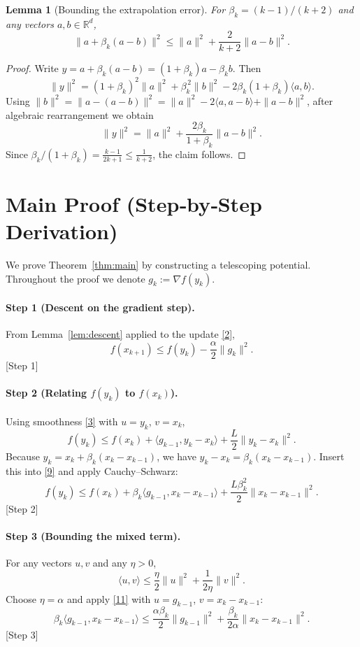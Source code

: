 \documentclass{article}
\newtheorem{lemma}{Lemma}
\newcommand{\R}{\mathbb{R}}
\begin{document}
\begin{lemma}[Bounding the extrapolation error]\label{lem:beta}
For $\beta_k=(k-1)/(k+2)$ and any vectors $a,b\in\R^d$,
\[
\|a+\beta_k(a-b)\|^2\le \|a\|^2+\frac{2}{k+2}\|a-b\|^2 .
\tag{7}
\]
\end{lemma}
\begin{proof}
Write $y=a+\beta_k(a-b) = (1+\beta_k)a-\beta_k b$.
Then
\[
\|y\|^2 = (1+\beta_k)^2\|a\|^2+\beta_k^{\,2}\|b\|^2-2\beta_k(1+\beta_k)\langle a,b\rangle .
\]
Using $\|b\|^2 = \|a-(a-b)\|^2 = \|a\|^2-2\langle a,a-b\rangle+\|a-b\|^2$, after algebraic rearrangement we obtain
\[
\|y\|^2 = \|a\|^2 + \frac{2\beta_k}{1+\beta_k}\|a-b\|^2 .
\]
Since $\beta_k/(1+\beta_k)=\frac{k-1}{2k+1}\le \frac{1}{k+2}$, the claim follows.
\end{proof}

\section*{Main Proof (Step‑by‑Step Derivation)}
We prove Theorem~\ref{thm:main} by constructing a telescoping potential.
Throughout the proof we denote $g_k:=\nabla f(y_k)$.

\paragraph{Step 1 (Descent on the gradient step).}
From Lemma~\ref{lem:descent} applied to the update \eqref{2},
\begin{equation}
f(x_{k+1}) \le f(y_k)-\frac{\alpha}{2}\|g_k\|^2 .
\tag{8}
\end{equation}
\hfill[Step 1]

\paragraph{Step 2 (Relating $f(y_k)$ to $f(x_k)$).}
Using smoothness \eqref{3} with $u=y_k$, $v=x_k$,
\[
f(y_k)\le f(x_k)+\langle g_{k-1},y_k-x_k\rangle+\frac{L}{2}\|y_k-x_k\|^2 .
\tag{9}
\]
Because $y_k = x_k+\beta_k(x_k-x_{k-1})$, we have $y_k-x_k=\beta_k (x_k-x_{k-1})$.
Insert this into \eqref{9} and apply Cauchy–Schwarz:
\[
f(y_k)\le f(x_k)+\beta_k\langle g_{k-1},x_k-x_{k-1}\rangle
      +\frac{L\beta_k^{2}}{2}\|x_k-x_{k-1}\|^2 .
\tag{10}
\]
\hfill[Step 2]

\paragraph{Step 3 (Bounding the mixed term).}
For any vectors $u,v$ and any $\eta>0$,
\[
\langle u,v\rangle \le \frac{\eta}{2}\|u\|^2+\frac{1}{2\eta}\|v\|^2 .
\tag{11}
\]
Choose $\eta = \alpha$ and apply \eqref{11} with $u=g_{k-1}$, $v=x_k-x_{k-1}$:
\[
\beta_k\langle g_{k-1},x_k-x_{k-1}\rangle
\le \frac{\alpha\beta_k}{2}\|g_{k-1}\|^2
   +\frac{\beta_k}{2\alpha}\|x_k-x_{k-1}\|^2 .
\tag{12}
\]
\hfill[Step 3]
\end{document}
